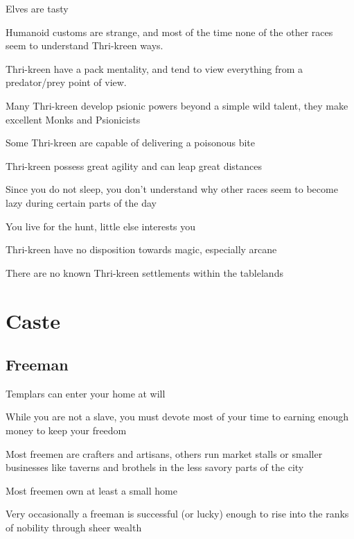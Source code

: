 \begin{description}
    \item Elves are tasty
    \item Humanoid customs are strange, and most of the time none of the other races seem to understand Thri-kreen ways.
    \item Thri-kreen have a pack mentality, and tend to view everything from a predator/prey point of view.
    \item Many Thri-kreen develop psionic powers beyond a simple wild talent, they make excellent Monks and Psionicists
    \item Some Thri-kreen are capable of delivering a poisonous bite
    \item Thri-kreen possess great agility and can leap great distances
    \item Since you do not sleep, you don’t understand why other races seem to become lazy during certain parts of the day
    \item You live for the hunt, little else interests you
    \item Thri-kreen have no disposition towards magic, especially arcane
    \item There are no known Thri-kreen settlements within the tablelands
\end{description}

\section{Caste}
\subsection{Freeman}

\begin{description}
    \item Templars can enter your home at will
    \item While you are not a slave, you must devote most of your time to earning enough money to keep your freedom
    \item Most freemen are crafters and artisans, others run market stalls or smaller businesses like taverns and brothels in the less savory parts of the city
    \item Most freemen own at least a small home
    \item Very occasionally a freeman is successful (or lucky) enough to rise into the ranks of nobility through sheer wealth
\end{description}

